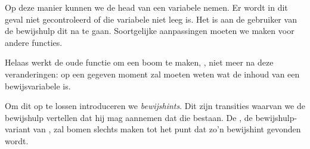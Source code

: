 

Op deze manier kunnen we de head van een variabele nemen. Er wordt in dit geval
niet gecontroleerd of die variabele niet leeg is. Het is aan de gebruiker van
de bewijshulp dit na te gaan. Soortgelijke aanpassingen moeten we maken voor
andere functies.

Helaas werkt de oude functie om een boom te maken, , niet meer na deze
veranderingen: op een gegeven moment zal  moeten weten wat de inhoud
van een bewijsvariabele is.

Om dit op te lossen introduceren we \emph{bewijshints}. Dit zijn transities
waarvan we de bewijshulp vertellen dat hij mag aannemen dat die bestaan. De
, de bewijshulp-variant van , zal bomen slechts maken tot
het punt dat zo'n bewijshint gevonden wordt.
